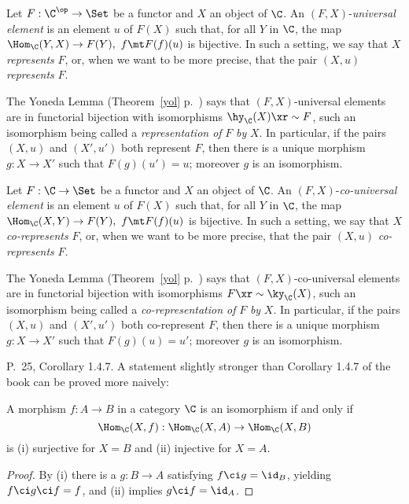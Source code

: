 \documentclass[12pt]{article}
\theoremstyle{remark}
\theoremstyle{definition}
\begin{document}
\begin{df} 
Let $F:\C^{\op}\to\Set$ be a functor and $X$ an object of $\C$. An $(F,X)$-\emph{universal element} is an element $u$ of $F(X)$ such that, for all $Y$ in $\C$, the map $\Hom_\C(Y,X)\to F(Y),\ f\mt F(f)(u)$ is bijective. In such a setting, we say that $X$ \emph{represents} $F$, or, when we want to be more precise, that the pair $(X,u)$ \emph{represents} $F$. %
\end{df}

The Yoneda Lemma (Theorem~\ref{yol} p.~) says that $(F,X)$-universal elements are in functorial bijection with isomorphisms $\hy_\C(X)\xr\sim F$, such an isomorphism being called a {\em representation of} $F$ \emph{by} $X$. In particular, if the pairs $(X,u)$ and $(X',u')$ both represent $F$, then there is a unique morphism $g:X\to X'$ such that $F(g)(u')=u$; moreover $g$ is an isomorphism.

\begin{df} 
Let $F:\C\to\Set$ be a functor and $X$ an object of $\C$. An $(F,X)$-\emph{co-universal element} is an element $u$ of $F(X)$ such that, for all $Y$ in $\C$, the map $\Hom_\C(X,Y)\to F(Y),\ f\mt F(f)(u)$ is bijective. In such a setting, we say that $X$ \emph{co-represents} $F$, or, when we want to be more precise, that the pair $(X,u)$ \emph{co-represents} $F$. %
\end{df}

The Yoneda Lemma (Theorem~\ref{yol} p.~) says that $(F,X)$-co-universal elements are in functorial bijection with isomorphisms $F\xr\sim\ky_\C(X)$, such an isomorphism being called a \emph{co-representation of} $F$ \emph{by} $X$. In particular, if the pairs $(X,u)$ and $(X',u')$ both co-represent $F$, then there is a unique morphism $g:X\to X'$ such that $F(g)(u)=u'$; moreover $g$ is an isomorphism.



\begin{s} 
P.~25, Corollary 1.4.7. A statement slightly stronger than Corollary 1.4.7 of the book can be proved more naively:

\begin{prop}
A morphism $f:A\to B$ in a category $\C$ is an isomorphism if and only if 
$$
\Hom_\C(X,f):\Hom_\C(X,A)\to\Hom_\C(X,B)
$$
is (i) surjective for $X=B$ and (ii) injective for $X=A$.
\end{prop}

\begin{proof} By (i) there is a $g:B\to A$ satisfying $f\ci g=\id_B$, yielding $f\ci g\ci f=f$, and (ii) implies $g\ci f=\id_A$.
\end{proof}
\end{s}
\end{document}
